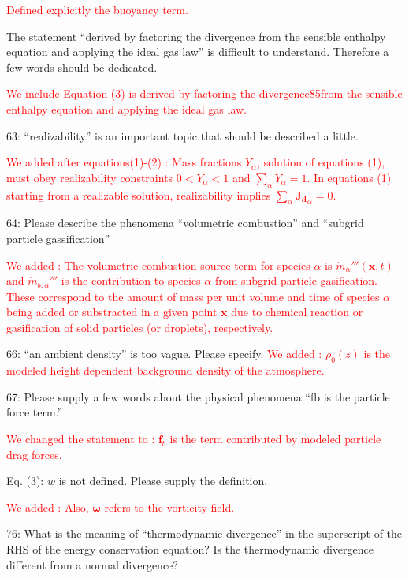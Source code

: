 \documentclass[12pt]{article}
\newcommand\hl[1]{\textcolor{red}{#1}}
\begin{document}
\hl{Defined explicitly the buoyancy term.}


The statement ``derived by factoring the divergence from the sensible enthalpy equation and applying the ideal gas law'' is difficult to understand. Therefore a few words should be dedicated.

\hl{We include Equation (3) is derived by factoring the divergence85from the sensible enthalpy equation and applying the ideal gas law.}

63: ``realizability'' is an important topic that should be described a little. 

\hl{We added after equations(1)-(2) : Mass fractions $Y_\alpha$, solution of equations (1), must obey realizability constraints $0<Y_\alpha<1$ and $\sum_\alpha Y_\alpha=1$. In equations (1) starting from a realizable solution, realizability implies $\sum_\alpha \mathbf{J_{d}}_\alpha = 0$.}


64: Please describe the phenomena ``volumetric combustion'' and ``subgrid particle gassification'' 

\hl{We added : The volumetric combustion source term for species $\alpha$ is $\dot{m}_\alpha'''(\mathbf{x},t)$  and $\dot{m}_{b,\alpha}'''$ is the contribution to species $\alpha$ from subgrid particle gasification. These correspond to the amount of mass per unit volume and time of species $\alpha$ being added or substracted in a given point $\mathbf{x}$ due to chemical reaction or gasification of solid particles (or droplets), respectively.}

66: ``an ambient density'' is too vague. Please specify. 
\hl{We added : $\rho_0(z)$ is the modeled height dependent background density of the atmosphere.}

67: Please supply a few words about the physical phenomena ``fb is the particle force term.''  

\hl{We changed the statement to : $\mathbf{f}_{b}$ is the term contributed by modeled particle drag forces.}

Eq. (3): $w$ is not defined. Please supply the definition. 

\hl{We added : Also, $\boldsymbol{\omega}$ refers to the vorticity field.}


76: What is the meaning of ``thermodynamic divergence'' in the superscript of the RHS of the energy conservation equation? Is the thermodynamic divergence different from a normal divergence? 
\end{document}

